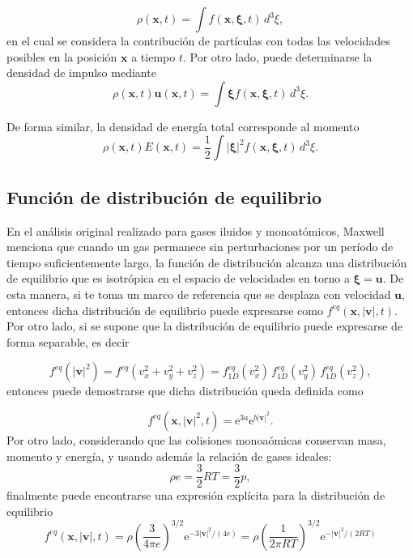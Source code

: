 \begin{equation}
	\rho(\bm{x},t) = \int f(\bm{x},\bm{\xi},t) \, d^3 \xi,
\end{equation}
en el cual se considera la contribuci\'on de part\'iculas con todas las velocidades posibles en la posici\'on $\bm{x}$ a tiempo $t$. Por otro lado, puede determinarse la densidad de impulso mediante
\begin{equation}
	\rho(\bm{x},t) \bm{u}(\bm{x},t) = \int \bm{\xi} f(\bm{x},\bm{\xi},t) \, d^3 \xi.
\end{equation}

De forma similar, la densidad de energ\'ia total corresponde al momento
\begin{equation}
	\rho(\bm{x},t) E(\bm{x},t) = \dfrac{1}{2} \int |\bm{\xi}|^2 f(\bm{x},\bm{\xi},t) \, d^3 \xi.
\end{equation}


\subsection{Funci\'on de distribuci\'on de equilibrio}
En el an\'alisis original realizado para gases iluidos y monoat\'omicos, Maxwell menciona que cuando un gas permanece sin perturbaciones por un per\'iodo de tiempo suficientemente largo, la funci\'on de distribuci\'on \fvar{} alcanza una distribuci\'on de equilibrio \feqvar{} que es isotr\'opica en el espacio de velocidades en torno a $\bm{\xi} = \bm{u}$. De esta manera, si te toma un marco de referencia que se desplaza con velocidad $\bm{u}$, entonces dicha distribuci\'on de equilibrio puede expresarse como $f^{eq}(\bm{x},|\bm{v}|,t)$. Por otro lado, si se supone que la distribuci\'on de equilibrio puede expresarse de forma separable, es decir 

\begin{equation}
	f^{eq}(|\bm{v}|^2) = f^{eq}(v_x^2 + v_y^2 + v_z^2)=f_{1D}^{eq}(v_x^2) \, f_{1D}^{eq}(v_y^2) \, f_{1D}^{eq}(v_z^2),
\end{equation}
entonces puede demostrarse que dicha distribuci\'on queda definida como

\begin{equation}
	f^{eq}(\bm{x},|\bm{v}|^2,t) = \mbox{e}^{3a}\mbox{e}^{b|\bm{v}|^2}.
\end{equation}
Por otro lado, considerando que las colisiones monoa\'omicas conservan masa, momento y energ\'ia, y usando adem\'as la relaci\'on de gases ideales:
\begin{equation}
	\rho e = \frac{3}{2}RT=\frac{3}{2}p,
\end{equation}
finalmente puede encontrarse una expresi\'on expl\'icita para la distribuci\'on de equilibrio
\begin{equation}
	f^{eq}(\bm{x},|\bm{v}|,t) 
	= \rho \left( \dfrac{3}{4\pi e} \right)^{3/2} \mbox{e}^{-3|\bm{v}|^2/(4e)}
	= \rho \left( \dfrac{1}{2\pi RT} \right)^{3/2} \mbox{e}^{-|\bm{v}|^2/(2RT)}
\end{equation}

